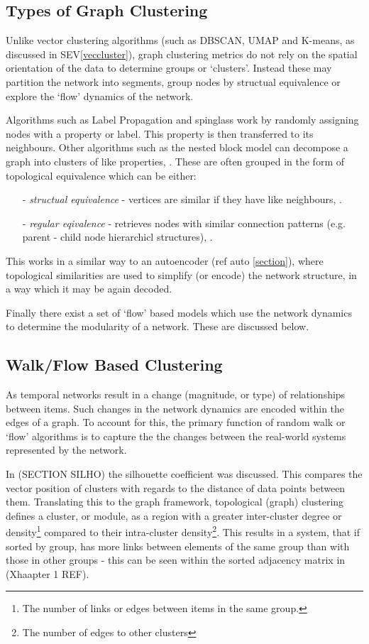  \subsection{Types of Graph Clustering}
Unlike vector clustering algorithms (such as DBSCAN, UMAP and K-means, as discussed in SEV\autoref{veccluster}), graph clustering metrics do not rely on the spatial orientation of the data to determine groups or `clusters'. Instead these may partition the network into segments, group nodes by structual equivalence or explore the `flow' dynamics of the network.

Algorithms such as Label Propagation \citep{labelprop} and spinglass \citep{spinglass} work by randomly assigning nodes with a property or label. This property is then transferred to its neighbours. Other algorithms such as the nested block model can decompose a graph into clusters of like properties, \citep{communitygraph}. These are often grouped in the form of topological equivalence which can be either:
\begin{itemize}
    \item[-]\textit{structual equivalence} - vertices are similar if they have like neighbours, \citep{strueq}.
    \item[-]\textit{regular eqivalence} - retrieves nodes with similar connection patterns (e.g. parent - child node hierarchicl structures), \citep{regequiv}.
\end{itemize}
This works in a similar way to an autoencoder (ref auto \autoref{section}), where topological similarities are used to simplify (or encode) the network structure, in a way which it may be again decoded.

Finally there exist a set of `flow' based models which use the network dynamics to determine the modularity of a network. These are discussed below.

\subsection{Walk/Flow Based Clustering}
As temporal networks result in a change (magnitude, or type) of relationships between items. Such changes in the network dynamics are encoded within the edges of a graph. To account for this, the primary function of random walk or `flow' algorithms is to capture the the changes between the real-world systems represented by the network.

In (SECTION SILHO) the silhouette coefficient was discussed. This compares the vector position of clusters with regards to the distance of data points between them. Translating this to the graph framework, topological (graph) clustering defines a cluster, or module, as a region with a greater inter-cluster degree or density\footnote{The number of links or edges between items in the same group.} compared to their intra-cluster density\footnote{The number of edges to other clusters}. This results in a system, that if sorted by group, has more links between elements of the same group than with those in other groups - this can be seen within the sorted adjacency matrix in (Xhaapter 1 REF).

